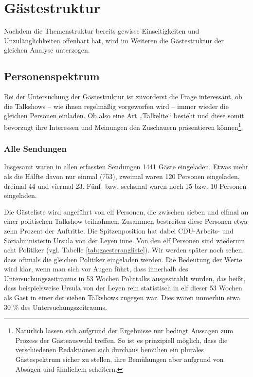 \section{Gästestruktur}

Nachdem die Themenstruktur bereits gewisse Einseitigkeiten und Unzulänglichkeiten offenbart hat, wird im Weiteren die Gästestruktur der gleichen Analyse unterzogen.

\subsection{Personenspektrum}\label{chap:personenspektrum}

Bei der Untersuchung der Gästestruktur ist zuvorderst die Frage interessant, ob die  Talkshows – wie ihnen regelmäßig vorgeworfen wird – immer wieder die gleichen Personen einladen. Ob also eine Art „Talkelite“ besteht und diese somit bevorzugt ihre Interessen und Meinungen den Zuschauern präsentieren können\footnote{Natürlich lassen sich aufgrund der Ergebnisse nur bedingt Aussagen zum Prozess der Gästeauswahl treffen. So ist es prinzipiell möglich, dass die verschiedenen Redaktionen sich durchaus bemühen ein plurales Gästespektrum sicher zu stellen, ihre Bemühungen aber aufgrund von Absagen und ähnlichem scheitern.}.

\subsubsection{Alle Sendungen}

Insgesamt waren in allen erfassten Sendungen 1441 Gäste eingeladen. Etwas mehr als die Hälfte davon nur einmal (753), zweimal waren 120 Personen eingeladen, dreimal  44 und viermal 23. Fünf- bzw. sechsmal waren noch 15 bzw. 10 Personen eingeladen.

Die Gästeliste wird angeführt von elf Personen, die zwischen sieben und elfmal an einer politischen Talkshow teilnahmen. Zusammen bestreiten diese Personen etwa zehn Prozent der Auftritte. Die Spitzenposition hat dabei CDU-Arbeits- und Sozialministerin Ursula von der Leyen inne. Von den elf Personen sind wiederum acht Politiker (vgl. Tabelle \vref{tab:gaesterangliste}). Wir werden später noch sehen, dass oftmals die gleichen Politiker eingeladen werden. Die Bedeutung der Werte wird klar, wenn man sich vor Augen führt, dass innerhalb des Untersuchungszeitraums in 53 Wochen Polittalks ausgestrahlt wurden, das heißt, dass beispielsweise Ursula von der Leyen rein statistisch in elf dieser 53 Wochen als Gast in einer der sieben Talkshows zugegen war. Dies wären immerhin etwa 30 \% des Untersuchungszeitraums.

